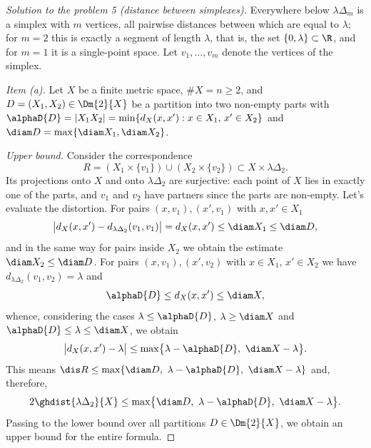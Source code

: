\documentclass[a4paper,12pt]{report}
\begin{document}
\begin{proof}[Solution to the problem \textup{5} \textup{(}distance between simplexes\textup{)}]
Everywhere below $\lambda\Delta_m$ is a simplex with $m$ vertices, all pairwise distances between which are equal to $\lambda$\textup{;} for $m=2$ this is exactly a segment of length $\lambda$, that is, the set $\{0,\lambda\}\subset\R$, and for $m=1$ it is a single-point space. Let $v_1,\dots,v_m$ denote the vertices of the simplex.

\textit{Item \textup{(a)}.} Let $X$ be a finite metric space, $\#X=n\ge2$, and $D=(X_1,X_2)\in\Dm{2}{X}$ be a partition into two non-empty parts with $\alphaD{D}=|X_1X_2|=\min\{d_X(x,x'):x\in X_1,\,x'\in X_2\}$ and $\diam D=\max\{\diam X_1,\diam X_2\}$.

\textit{Upper bound.} Consider the correspondence
\[
R=(X_1\times\{v_1\})\cup(X_2\times\{v_2\})\subset X\times\lambda\Delta_2 .
\]
Its projections onto $X$ and onto $\lambda\Delta_2$ are surjective\textup{:} each point of $X$ lies in exactly one of the parts, and $v_1$ and $v_2$ have partners since the parts are non-empty. Let's evaluate the distortion. For pairs $(x,v_1),(x',v_1)$ with $x,x'\in X_1$
\[
\bigl|d_X(x,x')-d_{\lambda\Delta_2}(v_1,v_1)\bigr|=d_X(x,x')\le\diam X_1\le\diam D ,
\]
and in the same way for pairs inside $X_2$ we obtain the estimate $\diam X_2\le\diam D$. For pairs $(x,v_1),(x',v_2)$ with $x\in X_1$, $x'\in X_2$ we have $d_{\lambda\Delta_2}(v_1,v_2)=\lambda$ and
\[
\alphaD{D}\le d_X(x,x')\le\diam X ,
\]
whence, considering the cases $\lambda\le\alphaD{D}$, $\lambda\ge\diam X$ and $\alphaD{D}\le\lambda\le\diam X$, we obtain
\[
\bigl|d_X(x,x')-\lambda\bigr|\le\max\bigl\{\lambda-\alphaD{D},\ \diam X-\lambda\bigr\} .
\]
This means $\dis R\le\max\{\diam D,\ \lambda-\alphaD{D},\ \diam X-\lambda\}$ and, therefore,
\[
2\ghdist{\lambda\Delta_2}{X}\le\max\bigl\{\diam D,\ \lambda-\alphaD{D},\ \diam X-\lambda\bigr\} .
\]
Passing to the lower bound over all partitions $D\in\Dm{2}{X}$, we obtain an upper bound for the entire formula.


\end{proof}
\end{document}
